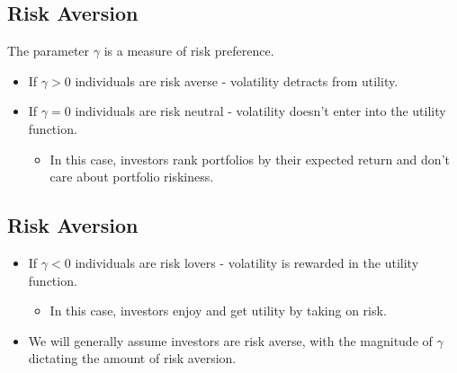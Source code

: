 \documentclass[letterpaper,10pt,english]{sphinxmanual}
\begin{document}
\subsection{Risk Aversion}
\label{allocation:risk-aversion}
The parameter $\gamma$ is a measure of risk
preference.
\begin{itemize}
\item {} 
If $\gamma > 0$ individuals are risk averse - volatility
detracts from utility.

\end{itemize}
\begin{itemize}
\item {} 
If $\gamma = 0$ individuals are risk neutral - volatility
doesn't enter into the utility function.
\begin{itemize}
\item {} 
In this case, investors rank portfolios by their expected return
and don't care about portfolio riskiness.

\end{itemize}

\end{itemize}


\subsection{Risk Aversion}
\label{allocation:id1}\begin{itemize}
\item {} 
If $\gamma < 0$ individuals are risk lovers - volatility is
rewarded in the utility function.
\begin{itemize}
\item {} 
In this case, investors enjoy and get utility by taking on risk.

\end{itemize}

\end{itemize}
\begin{itemize}
\item {} 
We will generally assume investors are risk averse, with the
magnitude of $\gamma$ dictating the amount of risk aversion.

\end{itemize}
\end{document}
